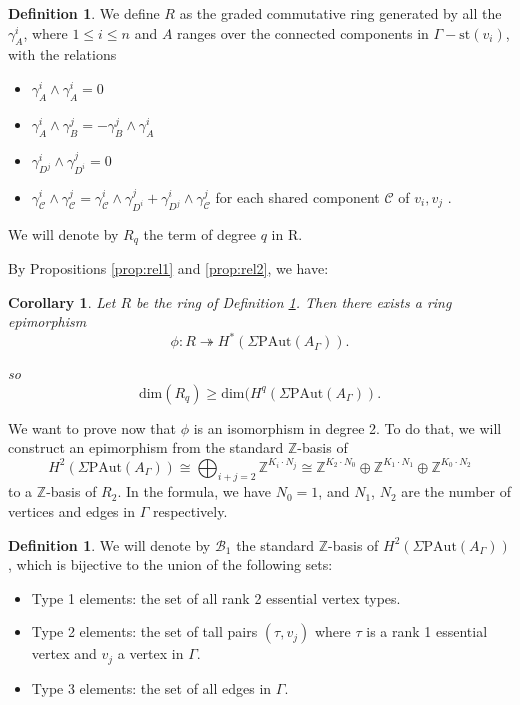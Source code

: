 \documentclass[a4paper]{amsart}
\newcommand{\G}{\Gamma}
\newcommand{\B}{\mathcal{B}}
\newcommand{\C}{\mathcal{C}}
\newcommand{\A}{{A_\Gamma}}
\newcommand{\PAut}{\Sigma\mathrm{PAut}}
\newcommand{\st}{\mathrm{st}}
\newtheorem{cor}[teo]{Corollary}
\theoremstyle{definition}
\newtheorem{defi}[teo]{Definition}
\theoremstyle{remark}
\begin{document}
\begin{defi}\label{def:ringR}
    We define $R$ as the graded commutative ring generated by all the $\gamma_A^i$, where $1\leq i\leq n$ and $A$ ranges over the connected components in $\G-\st(v_i)$, with the relations 
    \begin{itemize}
        \item[(1)] $\gamma_A^i\wedge\gamma_A^i=0$
        \item[(2)] $\gamma_A^i\wedge\gamma_B^j=-\gamma_B^j\wedge\gamma_A^i$
        \item[(3)] $\gamma_{D^j}^i\wedge \gamma_{D^i}^j=0$ 
        \item[(4)] $\gamma_{\mathcal{C}}^i\wedge \gamma_{\mathcal{C}}^j=\gamma_{\mathcal{C}}^i\wedge \gamma_{D^i}^j+ \gamma_{D^j}^i\wedge\gamma_{\mathcal{C}}^j$ for each shared component $\C$ of $v_i,v_j$ .
    \end{itemize}
    
We will denote by $R_q$ the term of degree $q$ in R.
\end{defi}

By Propositions \ref{prop:rel1} and \ref{prop:rel2}, we have:

\begin{cor}
    Let $R$ be the ring of Definition \ref{def:ringR}. Then there exists a ring epimorphism
    $$
    \phi:  R  \twoheadrightarrow H^*(\PAut(A_\G)).
    $$

  so
$$
\textrm{dim}(R_q)\geq \textrm{dim}(H^q(\PAut(A_\G)).
    $$    
    \label{cor:H2_1}
\end{cor}

We want to prove now that $\phi$ is an isomorphism in degree 2. To do that,  we will  construct an epimorphism from the standard $\mathbb{Z}$-basis of
\begin{equation}
     H^2(\PAut(A_\G))\cong \bigoplus_{i+j=2} \mathbb{Z}^{K_i\cdot N_j}\cong \mathbb{Z}^{K_2\cdot N_0}\oplus\mathbb{Z}^{K_1\cdot N_1}\oplus\mathbb{Z}^{K_0\cdot N_2}
\end{equation}
to a $\mathbb{Z}$-basis of $R_2$. In the formula, we have $N_0=1$, and $N_1$, $N_2$ are the number of vertices and edges in $\G$ respectively. 



\begin{defi}
    We will denote by $\B_1$  the standard $\mathbb{Z}$-basis of $H^2(\PAut(\A))$, which is bijective to the union of the following sets:
    \begin{itemize}
        \item Type 1 elements: the set of all rank 2 essential vertex types.
        \item Type 2 elements:  the set of tall pairs $(\tau,v_j)$ where $\tau$ is a rank 1 essential vertex and $v_j$ a vertex in $\G$.
        \item Type 3 elements: the set of all edges in $\G$. 
    \end{itemize}
\end{defi}
\end{document}
